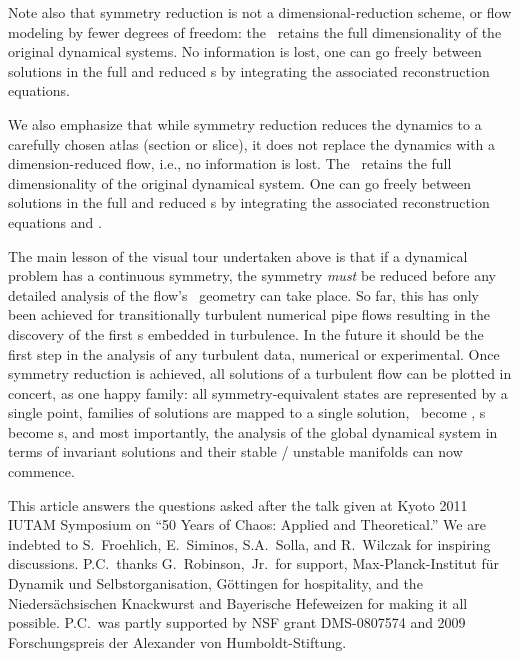 \documentclass[aip,cha,reprint,
secnumarabic,
nofootinbib, tightenlines,
nobibnotes, showkeys, showpacs,
groupedaddress
]{revtex4-1}
\begin{document}
Note also that symmetry reduction is not a dimensional-reduction scheme,
or flow modeling by fewer degrees of freedom: the \reducedsp\ retains the
full dimensionality of the original dynamical systems. No information is
lost, one can go freely between solutions in the full and reduced
\statesp s by integrating the associated {reconstruction equations}.

We also emphasize that while symmetry reduction reduces the dynamics to a carefully chosen atlas (section or slice), it does not replace the dynamics with a dimension-reduced flow, i.e., no information is lost. The \reducedsp\ retains the
full dimensionality of the original dynamical system. One can go freely between solutions in the full and reduced
\statesp s by integrating the associated {reconstruction equations}  and .

The main lesson of the visual tour undertaken above is that if a
dynamical problem has a continuous symmetry, the symmetry \emph{must} be
reduced before any detailed analysis of the flow's \statesp\ geometry can
take place. So far, this has only been achieved for transitionally
turbulent numerical pipe flows resulting in the discovery of
the first \rpo s embedded in turbulence. In the future it should be the first
step in the analysis of any turbulent data, numerical or
experimental. Once symmetry reduction is achieved, all
solutions of a turbulent flow can be plotted in concert, as one happy
family: all symmetry-equivalent states are represented by a single point,
families of solutions are mapped to a single solution, \reqva\ become
\eqva, \rpo s become \po s, and most importantly, the analysis of the global dynamical system in
terms of invariant solutions and their stable / unstable manifolds can
now commence.

\begin{acknowledgments}
This article answers the questions asked after the talk given at
Kyoto 2011 IUTAM Symposium on ``50 Years of Chaos: Applied and Theoretical.''
We are indebted to
S.~Froehlich,
E.~Siminos,
S.A.~Solla,
and
R.~Wilczak
for inspiring discussions.
P.C.\ thanks G.~Robinson,~Jr.\ for support,
Max-Planck-Institut f\"ur Dynamik und Selbstorganisation,
G\"ottingen for hospitality,
and the Nieders\"achsischen Knackwurst and Bayerische Hefeweizen for
making it all possible.
P.C.\ was partly supported by NSF grant DMS-0807574
and
2009 Forschungspreis der Alexander von Humboldt-Stiftung.
\end{acknowledgments}


% 

\end{document}
